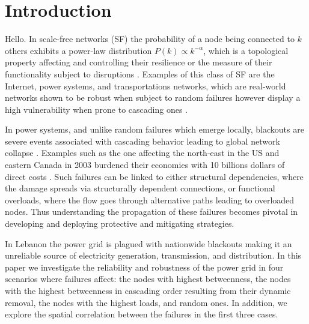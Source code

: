 \section{Introduction}
Hello. In scale-free networks (SF) the probability of a node being connected to $k$ others exhibits a power-law distribution $P(k) \propto k^{-\alpha}$, which is a topological property affecting and controlling their resilience or the measure of their functionality subject to disruptions \cite{Newman:2003da,Gao:2015fg,Bashan:2013cja,Gao:2015fga,2000Natur.406..378A}. Examples of this class of SF are the Internet, power systems, and transportations networks, which are real-world networks shown to be robust when subject to random failures however display a high vulnerability when prone to cascading ones \cite{Bompard:2011cd,DuenasOsorio:2009ff,2016arXiv160904310M,Cohen:2001hf}. 

In power systems, and unlike random failures which emerge locally, blackouts are severe events  associated with cascading behavior leading to global network collapse \cite{RosasCasals:2007td,Bompard:2009ga,Brummitt:2013jj,Daqing:2014bp,Albert:2004bw,Wang:2011js,Sole:2008cv}.
Examples such as the one affecting the north-east in the US and eastern Canada in 2003 burdened their economies with 10 billions dollars of direct costs \cite{Daqing:2014bp}. Such failures can be linked to either structural dependencies, where the damage spreads via structurally dependent connections, or functional overloads, where the flow goes through alternative paths leading to overloaded nodes. Thus understanding the propagation of these failures becomes pivotal in developing and deploying protective and mitigating strategies. 

In Lebanon the power grid is plagued with nationwide blackouts making it an unreliable source of electricity generation, transmission, and distribution. In this paper we investigate the reliability and robustness of the power grid in four scenarios where failures affect: the nodes with highest betweenness, the nodes with the highest betweenness in cascading order resulting from their dynamic removal, the nodes with the highest loads, and random ones. In addition, we explore the spatial correlation between the failures in the first three cases. 
